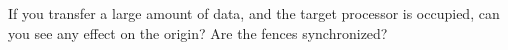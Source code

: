   If you transfer a large amount of data, and the target processor is
  occupied, can you see any effect on the origin? Are the fences
  synchronized?
